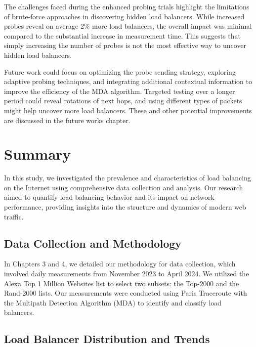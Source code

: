 \documentclass[12pt]{cwru_thesis}
\begin{document}
The challenges faced during the enhanced probing trials highlight the limitations of brute-force approaches in discovering hidden load balancers. While increased probes reveal on average 2\% more load balancers, the overall impact was minimal compared to the substantial increase in measurement time. This suggests that simply increasing the number of probes is not the most effective way to uncover hidden load balancers.

Future work could focus on optimizing the probe sending strategy, exploring adaptive probing techniques, and integrating additional contextual information to improve the efficiency of the MDA algorithm. Targeted testing over a longer period could reveal rotations of next hops, and using different types of packets might help uncover more load balancers. These and other potential improvements are discussed in the future works chapter.



\chapter{Summary}
In this study, we investigated the prevalence and characteristics of load balancing on the Internet using comprehensive data collection and analysis. Our research aimed to quantify load balancing behavior and its impact on network performance, providing insights into the structure and dynamics of modern web traffic.

\section*{Data Collection and Methodology}

In Chapters 3 and 4, we detailed our methodology for data collection, which involved daily measurements from November 2023 to April 2024. We utilized the Alexa Top 1 Million Websites list to select two subsets: the Top-2000 and the Rand-2000 lists. Our measurements were conducted using Paris Traceroute with the Multipath Detection Algorithm (MDA) to identify and classify load balancers.

\section*{Load Balancer Distribution and Trends}
\end{document}
